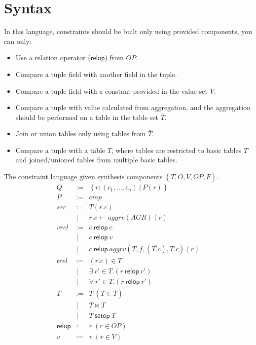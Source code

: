\documentclass[letter, notitlepage]{article}
\begin{document}
\section{Syntax}

In this language, constraints should be built only using provided components, you can only:
\begin{itemize}
\item Use a relation operator ($\mathsf{relop}$) from $\mathit{OP}$.
\item Compare a tuple field with another field in the tuple.
\item Compare a tuple field with a constant provided in the value set $V$.
\item Compare a tuple with value calculated from aggregation, and the aggregation should be performed on a table in the table set $\bar{T}$.
\item Join or union tables only using tables from $\bar{T}$.
\item Compare a tuple with a table $T$, where tables are restricted to basic tables $T$ and joined/unioned tables from multiple basic tables.  
\end{itemize} 

The constraint language given synthesis components $(\bar{T}, O, V, \mathit{OP}, F)$.
\[
\begin{array}{rcl}
Q & := & \left\{r:(c_1,...,c_n) ~|~ P(r) \right\}\\
P & := & cmp\\
src & := & T(\overline{r.c})\\
		& | & r.c \leftarrow aggrv(AGR)(r)\\
vrel & := & c~\mathsf{relop}~c\\
		& |  & c~\mathsf{relop}~v\\
		& |  & c~\mathsf{relop}~aggrv(T, f, (\overline{T.c}), T.c)(r)\\
trel & := & (\overline{r.c})\in T\\
		 & |  & \exists~r'\in T.(r~\mathsf{relop}~r')\\
		 & |  & \forall~r'\in T.(r~\mathsf{relop}~r')\\
T 	& := & T~(T\in \bar{T})\\
		& |  & T \bowtie T\\
		& |  & T~\mathsf{setop}~T\\
\mathsf{relop} & := & r~ (r\in \mathit{OP})\\ 
v 	& := & v~(v\in V)
\end{array}
\]
\end{document}
